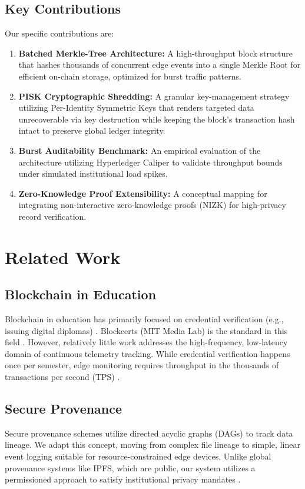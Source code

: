 \documentclass[conference]{IEEEtran}
\begin{document}
\subsection{Key Contributions}
Our specific contributions are:
\begin{enumerate}
    \item \textbf{Batched Merkle-Tree Architecture:} A high-throughput block structure that hashes thousands of concurrent edge events into a single Merkle Root for efficient on-chain storage, optimized for burst traffic patterns.
    \item \textbf{PISK Cryptographic Shredding:} A granular key-management strategy utilizing Per-Identity Symmetric Keys that renders targeted data unrecoverable via key destruction while keeping the block's transaction hash intact to preserve global ledger integrity.
    \item \textbf{Burst Auditability Benchmark:} An empirical evaluation of the architecture utilizing Hyperledger Caliper to validate throughput bounds under simulated institutional load spikes.
    \item \textbf{Zero-Knowledge Proof Extensibility:} A conceptual mapping for integrating non-interactive zero-knowledge proofs (NIZK) for high-privacy record verification.
\end{enumerate}

\section{Related Work}

\subsection{Blockchain in Education}
Blockchain in education has primarily focused on credential verification (e.g., issuing digital diplomas) \cite{b1, b3}. Blockcerts (MIT Media Lab) is the standard in this field \cite{b4}. However, relatively little work addresses the high-frequency, low-latency domain of continuous telemetry tracking. While credential verification happens once per semester, edge monitoring requires throughput in the thousands of transactions per second (TPS) \cite{b2}.

\subsection{Secure Provenance}
Secure provenance schemes \cite{b5} utilize directed acyclic graphs (DAGs) to track data lineage. We adapt this concept, moving from complex file lineage to simple, linear event logging suitable for resource-constrained edge devices. Unlike global provenance systems like IPFS, which are public, our system utilizes a permissioned approach to satisfy institutional privacy mandates \cite{b7}.
\end{document}

